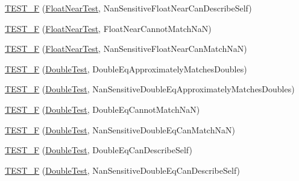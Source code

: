 \begin{DoxyCompactItemize}
\item 
\hyperlink{namespacetesting_1_1gmock__matchers__test_a4e90d53ea578d6b767559d8615a4c0c2}{T\+E\+S\+T\+\_\+F} (\hyperlink{namespacetesting_1_1gmock__matchers__test_a426b51f464dcb48033946e1bf3cc8795}{Float\+Near\+Test}, Nan\+Sensitive\+Float\+Near\+Can\+Describe\+Self)
\item 
\hyperlink{namespacetesting_1_1gmock__matchers__test_a2cd2ceebefa14a5d564a3bca60ed6572}{T\+E\+S\+T\+\_\+F} (\hyperlink{namespacetesting_1_1gmock__matchers__test_a426b51f464dcb48033946e1bf3cc8795}{Float\+Near\+Test}, Float\+Near\+Cannot\+Match\+NaN)
\item 
\hyperlink{namespacetesting_1_1gmock__matchers__test_ae7521865828fba53b45cc2819bec1273}{T\+E\+S\+T\+\_\+F} (\hyperlink{namespacetesting_1_1gmock__matchers__test_a426b51f464dcb48033946e1bf3cc8795}{Float\+Near\+Test}, Nan\+Sensitive\+Float\+Near\+Can\+Match\+NaN)
\item 
\hyperlink{namespacetesting_1_1gmock__matchers__test_a1b33dc485faca8c69184f3feb0476290}{T\+E\+S\+T\+\_\+F} (\hyperlink{namespacetesting_1_1gmock__matchers__test_a944cdd366ed240f29ae8e3ebc753ad5c}{Double\+Test}, Double\+Eq\+Approximately\+Matches\+Doubles)
\item 
\hyperlink{namespacetesting_1_1gmock__matchers__test_ab100ee4a4b0340e31212fb43c9e28255}{T\+E\+S\+T\+\_\+F} (\hyperlink{namespacetesting_1_1gmock__matchers__test_a944cdd366ed240f29ae8e3ebc753ad5c}{Double\+Test}, Nan\+Sensitive\+Double\+Eq\+Approximately\+Matches\+Doubles)
\item 
\hyperlink{namespacetesting_1_1gmock__matchers__test_a4c34f3f339de72d3f4f96a08a5125b59}{T\+E\+S\+T\+\_\+F} (\hyperlink{namespacetesting_1_1gmock__matchers__test_a944cdd366ed240f29ae8e3ebc753ad5c}{Double\+Test}, Double\+Eq\+Cannot\+Match\+NaN)
\item 
\hyperlink{namespacetesting_1_1gmock__matchers__test_ab42c199ae0008ce7550f584742caec28}{T\+E\+S\+T\+\_\+F} (\hyperlink{namespacetesting_1_1gmock__matchers__test_a944cdd366ed240f29ae8e3ebc753ad5c}{Double\+Test}, Nan\+Sensitive\+Double\+Eq\+Can\+Match\+NaN)
\item 
\hyperlink{namespacetesting_1_1gmock__matchers__test_a5975fb5a50e5364fe21422093680a559}{T\+E\+S\+T\+\_\+F} (\hyperlink{namespacetesting_1_1gmock__matchers__test_a944cdd366ed240f29ae8e3ebc753ad5c}{Double\+Test}, Double\+Eq\+Can\+Describe\+Self)
\item 
\hyperlink{namespacetesting_1_1gmock__matchers__test_a2d101d1823617f9b1346ee64cdce5216}{T\+E\+S\+T\+\_\+F} (\hyperlink{namespacetesting_1_1gmock__matchers__test_a944cdd366ed240f29ae8e3ebc753ad5c}{Double\+Test}, Nan\+Sensitive\+Double\+Eq\+Can\+Describe\+Self)

\end{DoxyCompactItemize}
